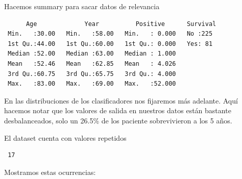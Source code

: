 Hacemos summary para sacar datos de relevancia

\begin{verbatim}
      Age             Year          Positive      Survival 
 Min.   :30.00   Min.   :58.00   Min.   : 0.000   No :225  
 1st Qu.:44.00   1st Qu.:60.00   1st Qu.: 0.000   Yes: 81  
 Median :52.00   Median :63.00   Median : 1.000            
 Mean   :52.46   Mean   :62.85   Mean   : 4.026            
 3rd Qu.:60.75   3rd Qu.:65.75   3rd Qu.: 4.000            
 Max.   :83.00   Max.   :69.00   Max.   :52.000            
\end{verbatim}

En las distribuciones de los clasificadores nos fijaremos más adelante. Aquí hacemos notar que los valores de salida en nuestros datos están bastante desbalanceados, solo un 26.5\% de los paciente sobrevivieron a los 5 años.

El dataset cuenta con valores repetidos

\begin{verbatim}
 17
\end{verbatim}

Mostramos estas ocurrencias:

